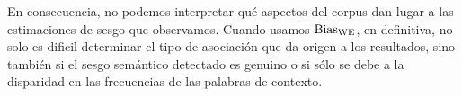 

En consecuencia, no podemos interpretar qué aspectos del corpus dan lugar a las estimaciones de sesgo que observamos. Cuando usamos $\operatorname{Bias_{WE}}$, en definitiva, no solo es dificil determinar el tipo de asociación que da origen a los resultados, sino también si el sesgo semántico detectado es genuino o si sólo se debe a la disparidad en las frecuencias de las palabras de contexto.

